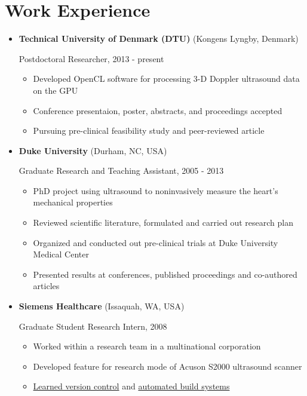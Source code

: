 \documentclass[letterpaper,10pt,english]{sphinxmanual}
\begin{document}
\chapter{Work Experience}
\label{resume:work-experience}\begin{itemize}
\item {} 
\textbf{Technical University of Denmark (DTU)} (Kongens Lyngby, Denmark)

Postdoctoral Researcher, 2013 - present
\begin{itemize}
\item {} 
Developed OpenCL software for processing 3-D Doppler ultrasound
data on the GPU

\item {} 
Conference presentaion, poster, abstracts, and proceedings
accepted

\item {} 
Pursuing pre-clinical feasibility study and peer-reviewed article

\end{itemize}

\item {} 
\textbf{Duke University} (Durham, NC, USA)

Graduate Research and Teaching Assistant, 2005 - 2013
\begin{itemize}
\item {} 
PhD project using ultrasound to noninvasively measure the heart's
mechanical properties

\item {} 
Reviewed scientific literature, formulated and carried out
research plan

\item {} 
Organized and conducted out pre-clinical trials at Duke University
Medical Center

\item {} 
Presented results at conferences, published proceedings and
co-authored articles

\end{itemize}

\item {} 
\textbf{Siemens Healthcare} (Issaquah, WA, USA)

Graduate Student Research Intern, 2008
\begin{itemize}
\item {} 
Worked within a research team in a multinational corporation

\item {} 
Developed feature for research mode of Acuson S2000 ultrasound
scanner

\item {} 
\href{http://www-03.ibm.com/software/products/en/clearcase}{Learned version
control}
and \href{http://www.visualstudio.com/}{automated build systems}

\end{itemize}

\end{itemize}
\end{document}
